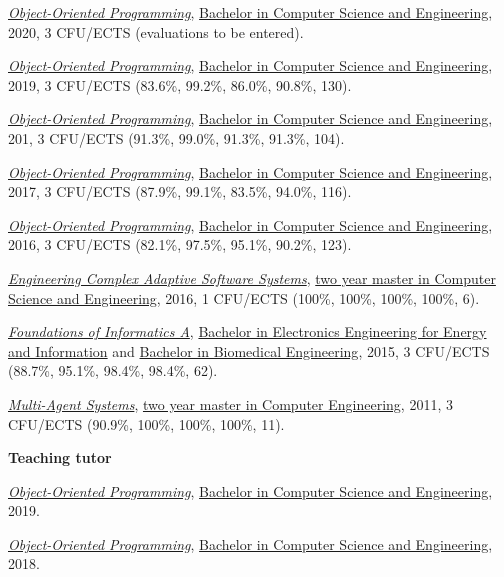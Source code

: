\begin{outerlist}
\begin{innerlist}
      \item \href{https://archive.is/WxwNn}{\textit{Object-Oriented Programming}}, \href{https://archive.is/WeNI1}{Bachelor in Computer Science and Engineering}, 2020, 3 CFU/ECTS (evaluations to be entered).
      \item \href{http://archive.fo/JtEDW}{\textit{Object-Oriented Programming}}, \href{http://archive.fo/UM5wl}{Bachelor in Computer Science and Engineering}, 2019, 3 CFU/ECTS (83.6\%, 99.2\%, 86.0\%, 90.8\%, 130).
      \item \href{http://archive.fo/srdtN}{\textit{Object-Oriented Programming}}, \href{http://archive.fo/UM5wl}{Bachelor in Computer Science and Engineering}, 201, 3 CFU/ECTS (91.3\%, 99.0\%, 91.3\%, 91.3\%, 104).
      \item \href{http://archive.fo/54lT9}{\textit{Object-Oriented Programming}}, \href{http://archive.fo/UM5wl}{Bachelor in Computer Science and Engineering}, 2017, 3 CFU/ECTS (87.9\%, 99.1\%, 83.5\%, 94.0\%, 116).
      \item \href{http://archive.fo/0XLbd}{\textit{Object-Oriented Programming}}, \href{http://archive.fo/UM5wl}{Bachelor in Computer Science and Engineering}, 2016, 3 CFU/ECTS (82.1\%, 97.5\%, 95.1\%, 90.2\%, 123).
      \item \href{http://archive.fo/1eIMt}{\textit{Engineering Complex Adaptive Software Systems}}, \href{http://archive.fo/toz5c}{two year master in Computer Science and Engineering}, 2016, 1 CFU/ECTS (100\%, 100\%, 100\%, 100\%, 6).
      \item \href{http://archive.fo/JrWEu/}{\textit{Foundations of Informatics A}}, \href{http://archive.fo/30rN0}{Bachelor in Electronics Engineering for Energy and Information} and \href{http://archive.fo/jW52L}{Bachelor in Biomedical Engineering}, 2015, 3 CFU/ECTS (88.7\%, 95.1\%, 98.4\%, 98.4\%, 62).
      \item \href{http://archive.fo/nnsBl/}{\textit{Multi-Agent Systems}}, \href{http://archive.fo/qDVq3}{two year master in Computer Engineering}, 2011, 3 CFU/ECTS (90.9\%, 100\%, 100\%, 100\%, 11).
    \end{innerlist}
\item[] \textbf{Teaching tutor} %
    \begin{innerlist}
      \item \href{http://archive.fo/JtEDW}{\textit{Object-Oriented Programming}}, \href{http://archive.fo/UM5wl}{Bachelor in Computer Science and Engineering}, 2019.
      \item \href{http://archive.fo/srdtN}{\textit{Object-Oriented Programming}}, \href{http://archive.fo/UM5wl}{Bachelor in Computer Science and Engineering}, 2018.

\end{innerlist}
\end{outerlist}
